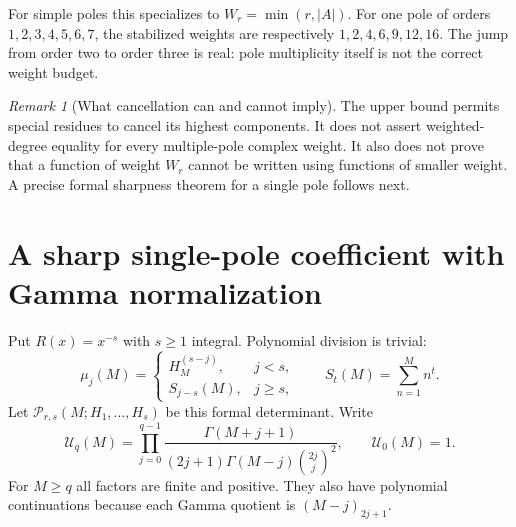 \documentclass[11pt,letterpaper]{article}
\numberwithin{equation}{section}
\theoremstyle{definition}\newtheorem{definition}[theorem]{Definition}
\theoremstyle{remark}\newtheorem{remark}[theorem]{Remark}
\begin{document}
For simple poles this specializes to $W_r=\min(r,|A|)$.
For one pole of orders $1,2,3,4,5,6,7$, the stabilized weights are
respectively $1,2,4,6,9,12,16$. The jump from order two to order three
is real: pole multiplicity itself is not the correct weight budget.

\begin{remark}[What cancellation can and cannot imply]
The upper bound permits special residues to cancel its highest
components. It does not assert weighted-degree equality for every
multiple-pole complex weight. It also does not prove that a function
of weight $W_r$ cannot be written using functions of smaller weight.
A precise formal sharpness theorem for a single pole follows next.
\end{remark}

\section{A sharp single-pole coefficient with Gamma normalization}

Put $R(x)=x^{-s}$ with $s\ge1$ integral. Polynomial division is trivial:
\begin{equation}\label{eq:singlemom}
 \mu_j(M)=\begin{cases}H_M^{(s-j)},&j<s,\\
 S_{j-s}(M),&j\ge s,\end{cases}
 \qquad S_t(M)=\sum_{n=1}^M n^t.
\end{equation}
Let $\mathcal P_{r,s}(M;H_1,\ldots,H_s)$ be this formal determinant.
Write
\begin{equation}\label{eq:uniformnorm}
 \mathcal U_q(M)=\prod_{j=0}^{q-1}
       \frac{\Gamma(M+j+1)}
       {(2j+1)\Gamma(M-j)\binom{2j}{j}^{\!2}},
 \qquad \mathcal U_0(M)=1.
\end{equation}
For $M\ge q$ all factors are finite and positive. They also have
polynomial continuations because each Gamma quotient is
$(M-j)_{2j+1}$.
\end{document}
